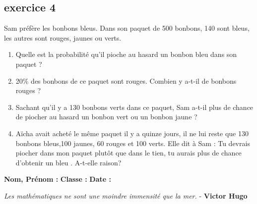 \documentclass[11pt]{article}
\begin{document}
\begin{multicols}{2}
  \subsection*{exercice 4}
  Sam préfère les bonbons bleus. 
  Dans son paquet de 500 bonbons, 140 sont bleus, les autres sont rouges, jaunes ou verts.

  \begin{enumerate}
  \item Quelle est la probabilité qu’il pioche au hasard un bonbon bleu dans son paquet ?
  \item 20\% des bonbons de ce paquet sont rouges. Combien y a-t-il de bonbons rouges ?
  \item Sachant qu’il y a 130 bonbons verts dans ce paquet, Sam a-t-il plus de chance de piocher au hasard un bonbon vert ou un bonbon jaune ?
  \item Aïcha avait acheté le même paquet il y a quinze jours, il ne lui reste que 130 bonbons bleus,100 jaunes, 60 rouges et 100 verts. Elle dit à Sam : \og Tu devrais piocher dans mon paquet plutôt que dans le tien, tu aurais plus de chance d’obtenir un bleu \fg.
    A-t-elle raison? 
  \end{enumerate}
\end{multicols}


\newpage

\textbf{Nom, Prénom :} \hspace{8cm} \textbf{Classe :} \hspace{3cm} \textbf{Date :}\\
\vspace{-0.8cm}
\begin{center}
  \textit{Les mathématiques ne sont une moindre immensité que la mer.}  - \textbf{Victor Hugo}
\end{center}
\vspace{-0.8cm}
\end{document}
